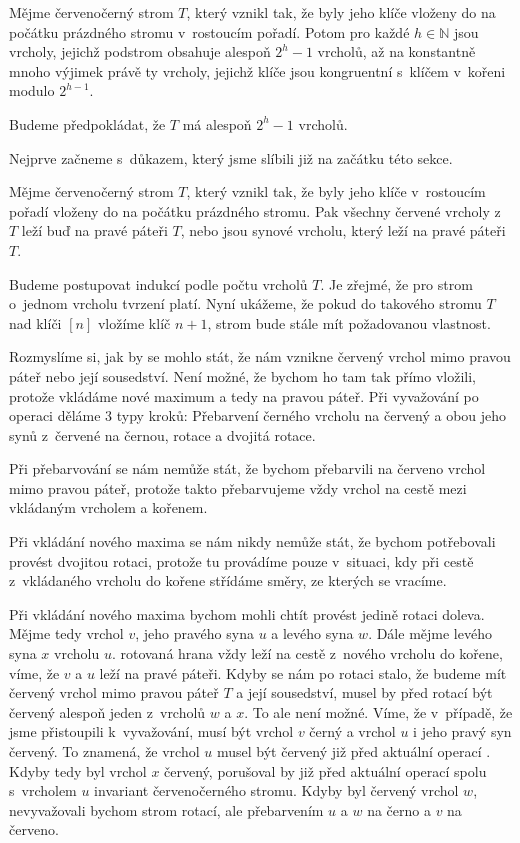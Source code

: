 \begin{tvrz}
Mějme červenočerný strom $T$, který vznikl tak, že byly jeho klíče vloženy do na počátku prázdného stromu v~rostoucím pořadí. Potom pro každé $h\in \mathbb N$ jsou vrcholy, jejichž podstrom obsahuje alespoň $2^h -1$ vrcholů, až na konstantně mnoho výjimek právě ty vrcholy, jejichž klíče jsou kongruentní s~klíčem v~kořeni modulo $2^{h-1}$.
\end{tvrz}

\begin{dukaz}
Budeme předpokládat, že $T$ má alespoň $2^h-1$ vrcholů.

Nejprve začneme s~důkazem, který jsme slíbili již na začátku této sekce.

\begin{lemma}
Mějme červenočerný strom $T$, který vznikl tak, že byly jeho klíče v~rostoucím pořadí vloženy do na počátku prázdného stromu. Pak všechny červené vrcholy z~$T$ leží buď na pravé páteři $T$, nebo jsou synové vrcholu, který leží na pravé páteři $T$.
\end{lemma}
\begin{dukaz}
Budeme postupovat indukcí podle počtu vrcholů $T$. Je zřejmé, že pro strom o~jednom vrcholu tvrzení platí. Nyní ukážeme, že pokud do takového stromu $T$ nad klíči $[n]$ vložíme klíč $n+1$, strom bude stále mít požadovanou vlastnost.

Rozmyslíme si, jak by se mohlo stát, že nám vznikne červený vrchol mimo pravou páteř nebo její sousedství. Není možné, že bychom ho tam tak přímo vložili, protože vkládáme nové maximum a tedy na pravou páteř. Při vyvažování po operaci  děláme 3 typy kroků: Přebarvení černého vrcholu na červený a obou jeho synů z~červené na černou, rotace a dvojitá rotace.

Při přebarvování se nám nemůže stát, že bychom přebarvili na červeno vrchol mimo pravou páteř, protože takto přebarvujeme vždy vrchol na cestě mezi vkládaným vrcholem a kořenem.

Při vkládání nového maxima se nám nikdy nemůže stát, že bychom potřebovali provést dvojitou rotaci, protože tu provádíme pouze v~situaci, kdy při cestě z~vkládaného vrcholu do kořene střídáme směry, ze kterých se vracíme.

Při vkládání nového maxima bychom mohli chtít provést jedině rotaci doleva.
Mějme tedy vrchol $v$, jeho pravého syna $u$ a levého syna $w$. Dále mějme levého syna $x$ vrcholu $u$.
rotovaná hrana vždy leží na cestě z~nového vrcholu do kořene, víme, že $v$ a
$u$ leží na pravé páteři. Kdyby se nám po rotaci stalo, že budeme mít červený vrchol mimo pravou páteř $T$ a její sousedství, musel by před rotací být červený alespoň jeden z~vrcholů $w$ a $x$. To ale není možné. Víme, že v~případě, že jsme přistoupili k~vyvažování, musí být vrchol $v$ černý a vrchol $u$ i jeho pravý syn červený. To znamená, že vrchol $u$ musel být červený již před aktuální operací . Kdyby tedy byl vrchol $x$ červený, porušoval by již před aktuální operací  spolu s~vrcholem $u$ invariant červenočerného stromu. Kdyby byl červený vrchol $w$, nevyvažovali bychom strom rotací, ale přebarvením $u$ a $w$ na černo a $v$ na červeno. 
\end{dukaz}


\end{dukaz}

